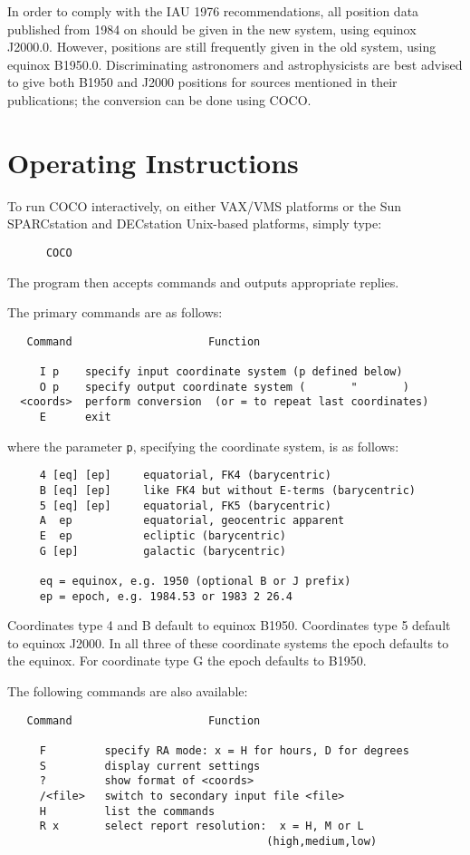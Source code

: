In order to comply with the IAU 1976 recommendations, all
position data published from 1984 on should be given in
the new system, using equinox J2000.0.
However, positions are still frequently given in
the old system, using equinox B1950.0.
Discriminating astronomers and astrophysicists are best
advised to give both B1950 and J2000
positions for sources mentioned in their publications; the
conversion can be done using COCO.

\section{Operating Instructions}
To run COCO interactively, on either VAX/VMS platforms or
the Sun SPARCstation and DECstation Unix-based platforms, simply type:
\begin{verbatim}
      COCO
\end{verbatim}
The program then accepts commands and outputs appropriate replies.

\goodbreak
The primary commands are as follows:
\begin{verbatim}
   Command                     Function

     I p    specify input coordinate system (p defined below)
     O p    specify output coordinate system (       "       )
  <coords>  perform conversion  (or = to repeat last coordinates)
     E      exit
\end{verbatim}
where the parameter {\tt p}, specifying the coordinate system, is
as follows:
\begin{verbatim}
     4 [eq] [ep]     equatorial, FK4 (barycentric)
     B [eq] [ep]     like FK4 but without E-terms (barycentric)
     5 [eq] [ep]     equatorial, FK5 (barycentric)
     A  ep           equatorial, geocentric apparent
     E  ep           ecliptic (barycentric)
     G [ep]          galactic (barycentric)

     eq = equinox, e.g. 1950 (optional B or J prefix)
     ep = epoch, e.g. 1984.53 or 1983 2 26.4
\end{verbatim}
Coordinates type 4 and B default to equinox B1950. Coordinates type 5 default
to equinox J2000. In all three of these coordinate systems the epoch defaults
to the equinox. For coordinate type G the epoch defaults to B1950.

The following commands are also available:
\begin{verbatim}
   Command                     Function

     F         specify RA mode: x = H for hours, D for degrees
     S         display current settings
     ?         show format of <coords>
     /<file>   switch to secondary input file <file>
     H         list the commands
     R x       select report resolution:  x = H, M or L
                                        (high,medium,low)
\end{verbatim}

